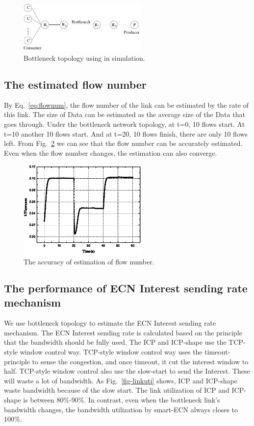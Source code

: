 \begin{figure}[t]
\centering
\includegraphics[width=2.5in]{bottleneck-topology.pdf}
\caption{Bottleneck topology using in simulation.}
\label{bottleneck-topology}
\end{figure}

\subsection{The estimated flow number}

By Eq.~\ref{eq:flownum}, the flow number of the link can be estimated by the rate of this link. The size of Data can be estimated as the average size of the Data that goes through. Under the bottleneck network topology, at t=0, 10 flows start. At t=10 another 10 flows start. And at t=20, 10 flows finish, there are only 10 flows left. From Fig.~\ref{fig-flownum} we can see that the flow number can be accurately estimated. Even when the flow number changes, the estimation can also converge.

\begin{figure}[t]
\centering
\includegraphics[width=2.5in]{flownum-pic-cut.eps}
\caption{The accuracy of estimation of flow number.}
\label{fig-flownum}
\end{figure}

\subsection{The performance of ECN Interest sending rate mechanism}

We use bottleneck topology to estimate the ECN Interest sending rate mechanism. The ECN Interest sending rate is calculated based on the principle that the bandwidth should be fully used. The ICP and ICP-shape use the TCP-style window control way. TCP-style window control way uses the timeout-principle to sense the congestion, and once timeout, it cut the interest window to half. TCP-style window control also use the slow-start to send the Interest. These will waste a lot of bandwidth. As Fig.~\ref{fig-linkuti} shows, ICP and ICP-shape waste bandwidth because of the slow start. The link utilization of ICP and ICP-shape is between 80\%-90\%. In contrast, even when the bottleneck link's bandwidth changes, the bandwidth utilization by smart-ECN always closes to 100\%.

